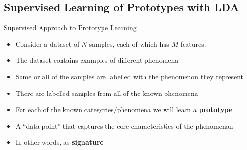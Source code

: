 \documentclass[aspectratio=169]{beamer}
\begin{document}
\subsection{Supervised Learning of Prototypes with LDA}

\begin{frame}{Supervised Approach to Prototype Learning}
  \begin{itemize}
    \item Consider a dataset of $N$ samples, each of which has $M$ features.
    \item The dataset contains examples of different phenomena
    \item Some or all of the samples are labelled with the phenomenon they represent
    \item There are labelled samples from all of the known phenomena
    \pause
    \item For each of the known categories/phenomena we will learn a \textbf{prototype}
    \item A ``data point'' that captures the core characteristics of the phenomenon
    \pause
    \item In other words, as \textbf{signature}
  \end{itemize}
\end{frame}
\end{document}
